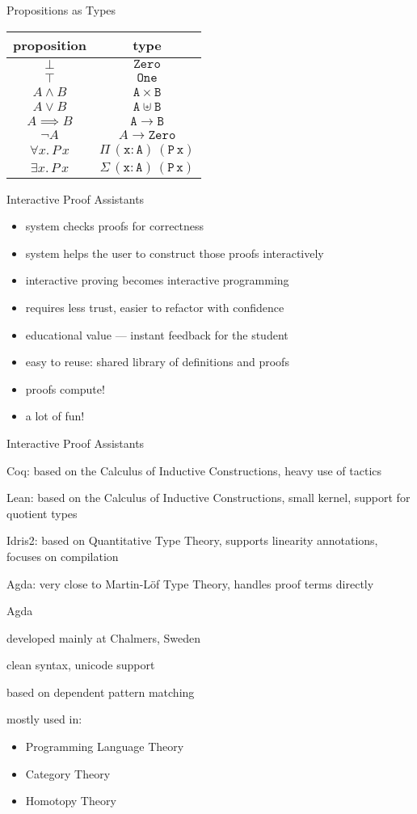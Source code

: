 \documentclass[dvipsnames]{beamer}
\newenvironment{wideitemize}{\itemize\addtolength{\itemsep}{1em}}{\enditemize}
\newcommand{\sitem}{\item[\raisebox{.45ex}{\rule{.6ex}{.6ex}}]}
\begin{document}
\begin{frame}{Propositions as Types}
\center
\begin{tabular}{ c | c }
  proposition & type \\ \hline{}
  $\bot$ & $\mathtt{Zero}$ \\
  $\top$ & $\mathtt{One}$ \\
  $A \land B$ & $\mathtt{A \times B}$ \\
  $A \lor B$ & $\mathtt{A \uplus B}$ \\
  $A \implies B$ & $\mathtt{A \to B}$ \\
  $\neg A$ & $A \to \mathtt{Zero}$ \\
  $\forall x . \, P \, x$ & $\mathtt{\Pi \, (x : A) \, (P \, x)}$ \\
  $\exists x . \, P \, x$ & $\mathtt{\Sigma \, (x : A) \, (P \, x)}$ \\
\end{tabular}
\end{frame}

\begin{frame}{Interactive Proof Assistants}
\begin{itemize}
  \sitem system checks proofs for correctness
  \sitem system helps the user to construct those proofs interactively
  \sitem interactive proving becomes interactive programming
  \sitem requires less trust, easier to refactor with confidence
  \sitem educational value --- instant feedback for the student
  \sitem easy to reuse: shared library of definitions and proofs
  \sitem proofs compute!
  \sitem a lot of fun!
\end{itemize}
\end{frame}

\begin{frame}{Interactive Proof Assistants}
  \begin{wideitemize}
  \sitem Coq: based on the Calculus of Inductive Constructions, heavy use of tactics
  \sitem Lean: based on the Calculus of Inductive Constructions, small kernel, support for quotient types
  \sitem Idris2: based on Quantitative Type Theory, supports linearity annotations, focuses on compilation
  \sitem Agda: very close to Martin-L\"of Type Theory, handles proof terms directly
  \end{wideitemize}
\end{frame}


\begin{frame}{Agda}
\begin{wideitemize}
  \sitem developed mainly at Chalmers, Sweden
  \sitem clean syntax, unicode support
  \sitem based on dependent pattern matching
  \sitem mostly used in:
    \begin{itemize}
      \sitem Programming Language Theory
      \sitem Category Theory
      \sitem Homotopy Theory
    \end{itemize}
\end{wideitemize}
\end{frame}
\end{document}
